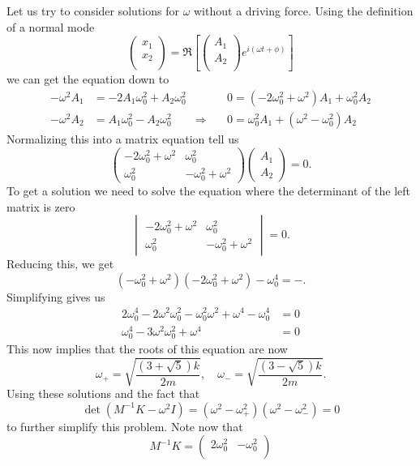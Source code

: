 \begin{sol}
\begin{enumerate}[label=\textbf{(\alph*)}]
Let us try to consider solutions for $\omega$ without a driving force. Using the definition of a normal mode 
\[
\begin{pmatrix}
x_1 \\
x_2 \\
\end{pmatrix}
= 
\Re \left[
\begin{pmatrix}
A_1 \\
A_2 \\
\end{pmatrix}
e^{i (\omega t + \phi)}
\right]
\]
we can get the equation down to 
$$\begin{aligned}- \omega^{2}A_1 &= -2A_1\omega_0^2 + A_2\omega_0^2 & & 0=\left(-2\omega_0^2 + \omega^{2}\right) A_{1}+ \omega_0^2 A_2 \\
-\omega^{2}A_2 &= A_1\omega_0^2 - A_2 \omega_0^2 & \Rightarrow \quad & 0= \omega_0^2 A_1 + (\omega^2 - \omega_0^2 )A_2 
\end{aligned}$$
Normalizing this into a matrix equation tell us 
\[
\begin{pmatrix}
-2\omega_0^2 + \omega^2 & \omega_0^2 \\
\omega_0^2 & -\omega_0^2 + \omega^2
\end{pmatrix}
\begin{pmatrix}
A_1 \\
A_2
\end{pmatrix}
= 0.\]
To get a solution we need to solve the equation where the determinant of the left matrix is zero
\[
\begin{vmatrix}
-2\omega_0^2 + \omega^2 & \omega_0^2 \\
\omega_0^2 & -\omega_0^2 + \omega^2
\end{vmatrix}
= 0.
\]
Reducing this, we get 
\[(-\omega_0^2 + \omega^2)(-2\omega_0^2 + \omega^2) - \omega_0^4 = -.\]
Simplifying gives us 
\begin{align*}
    2\omega_0^4 - 2\omega^2\omega_0^2 - \omega_0^2 \omega^2 + \omega^4 - \omega_0^4 &= 0 \\
    \omega_0^4 - 3\omega^2\omega_0^2 + \omega^4 &= 0
\end{align*}
This now implies that the roots of this equation are now 
\[\omega_{+} = \sqrt{\frac{(3 + \sqrt{5})k}{2m}}, \quad \omega_{-} = \sqrt{\frac{(3 - \sqrt{5})k}{2m}}.\]
Using these solutions and the fact that 
\[\det (M^{-1}K - \omega^2 I) = (\omega^2 - \omega_{+}^2)(\omega^2 - \omega_{-}^2) = 0\]
to further simplify this problem. Note now that 
\[M^{-1}K = \begin{pmatrix}
2\omega_0^2 & -\omega_0^2 \\ 

\end{pmatrix}\]
\end{enumerate}
\end{sol}
